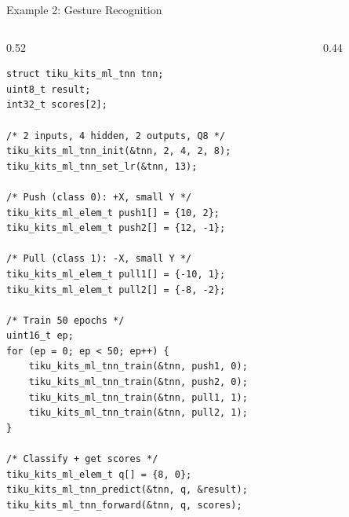 \documentclass[aspectratio=169, 10pt]{beamer}
\begin{document}
\begin{frame}[fragile]{Example 2: Gesture Recognition}
\begin{columns}[T]
\begin{column}{0.52\textwidth}
\begin{lstlisting}[style=cstyle,
  title={2-D accel: push vs. pull}]
struct tiku_kits_ml_tnn tnn;
uint8_t result;
int32_t scores[2];

/* 2 inputs, 4 hidden, 2 outputs, Q8 */
tiku_kits_ml_tnn_init(&tnn, 2, 4, 2, 8);
tiku_kits_ml_tnn_set_lr(&tnn, 13);

/* Push (class 0): +X, small Y */
tiku_kits_ml_elem_t push1[] = {10, 2};
tiku_kits_ml_elem_t push2[] = {12, -1};

/* Pull (class 1): -X, small Y */
tiku_kits_ml_elem_t pull1[] = {-10, 1};
tiku_kits_ml_elem_t pull2[] = {-8, -2};

/* Train 50 epochs */
uint16_t ep;
for (ep = 0; ep < 50; ep++) {
    tiku_kits_ml_tnn_train(&tnn, push1, 0);
    tiku_kits_ml_tnn_train(&tnn, push2, 0);
    tiku_kits_ml_tnn_train(&tnn, pull1, 1);
    tiku_kits_ml_tnn_train(&tnn, pull2, 1);
}

/* Classify + get scores */
tiku_kits_ml_elem_t q[] = {8, 0};
tiku_kits_ml_tnn_predict(&tnn, q, &result);
tiku_kits_ml_tnn_forward(&tnn, q, scores);
\end{lstlisting}
\end{column}

\begin{column}{0.44\textwidth}
\begin{center}
\end{center}
\end{column}
\end{columns}
\end{frame}
\end{document}
